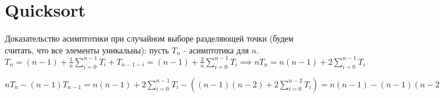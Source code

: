 \section{Quicksort}

Доказательство асимптотики при случайном выборе разделяющей точки (будем считать, что все элементы уникальны): пусть $T_n$ - асимптотика для $n$. $T_n = (n - 1) + \frac{1}{n} \sum \limits_{i=0}^{n-1} T_i + T_{n-1-i} = (n - 1) + \frac{2}{n} \sum \limits_{i=0}^{n-1} T_i \implies nT_n = n(n - 1) + 2 \sum \limits_{i=0}^{n-1} T_i$

$nT_n - (n-1)T_{n-1} = n(n - 1) + 2 \sum \limits_{i=0}^{n-1} T_i - ((n - 1)(n - 2) + 2 \sum \limits_{i=0}^{n-2} T_i) = n(n-1) - (n-1)(n-2) + 2T_{n-1} \implies nT_n = (n+1)T_{n-1} + 2n - 2 \implies \frac{T_n}{n+1} = \frac{T_{n-1}}{n} + \frac{2}{n+1} - \frac{2}{n(n+1)} \leq \frac{T_{n-1}}{n} + \frac{2}{n+1} = \frac{T_{n-2}}{n-1} + \frac{2}{n+1} + \frac{2}{n} - \frac{2}{n(n-1)} \leq \dots \leq \frac{T_1}{2} + \sum \limits_{i=1}^{n+1} \frac{2}{i} = O(n \log n)$